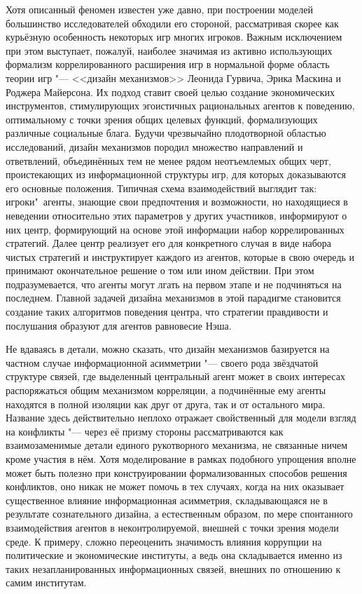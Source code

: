 Хотя описанный феномен известен уже давно, при построении моделей большинство исследователей обходили его стороной, рассматривая скорее как курьёзную особенность некоторых игр многих игроков. Важным исключением при этом выступает, пожалуй, наиболее значимая из активно использующих формализм коррелированного расширения игр в нормальной форме область теории игр "--- <<дизайн механизмов>> \ifsynopsis\smartcite{Nikolenko}\else\cite{Nikolenko}\fi Леонида Гурвича, Эрика Маскина и Роджера Майерсона. Их подход ставит своей целью создание экономических инструментов, стимулирующих эгоистичных рациональных агентов к поведению, оптимальному с точки зрения общих целевых функций, формализующих различные социальные блага. Будучи чрезвычайно плодотворной областью исследований, дизайн механизмов породил множество направлений и ответвлений, объединённых тем не менее рядом неотъемлемых общих черт, проистекающих из информационной структуры игр, для которых доказываются его основные положения. Типичная схема взаимодействий выглядит так: игроки"~агенты, знающие свои предпочтения и возможности, но находящиеся в неведении относительно этих параметров у других участников, информируют о них центр, формирующий на основе этой информации набор коррелированных стратегий. Далее центр реализует его для конкретного случая в виде набора чистых стратегий и инструктирует каждого из агентов, которые в свою очередь и принимают окончательное решение о том или ином действии. При этом подразумевается, что агенты могут лгать на первом этапе и не подчиняться на последнем. Главной задачей дизайна механизмов в этой парадигме становится создание таких алгоритмов поведения центра, что стратегии правдивости и послушания образуют для агентов равновесие Нэша.

Не вдаваясь в детали, можно сказать, что дизайн механизмов базируется на частном случае информационной асимметрии "--- своего рода звёздчатой структуре связей, где выделенный центральный агент может в своих интересах распоряжаться общим механизмом корреляции, а подчинённые ему агенты находятся в полной изоляции как друг от друга, так и от остального мира. Название здесь действительно неплохо отражает свойственный для модели взгляд на конфликты "--- через её призму стороны рассматриваются как взаимозаменимые детали единого рукотворного механизма, не связанные ничем кроме участия в нём. Хотя моделирование в рамках подобного упрощения вполне может быть полезно при конструировании формализованных способов решения конфликтов, оно никак не может помочь в тех случаях, когда на них оказывает существенное влияние информационная асимметрия, складывающаяся не в результате сознательного дизайна, а естественным образом, по мере спонтанного взаимодействия агентов в неконтролируемой, внешней с точки зрения модели среде. К примеру, сложно переоценить значимость влияния коррупции на политические и экономические институты, а ведь она складывается именно из таких незапланированных информационных связей, внешних по отношению к самим институтам.


